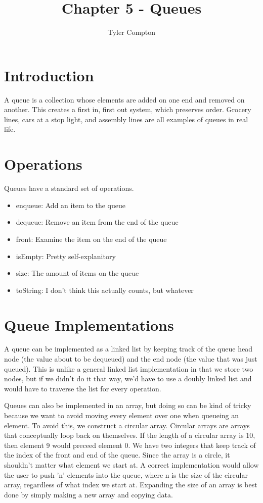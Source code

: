 \documentclass{article}
\author{Tyler Compton}
\title{Chapter 5 - Queues}
\begin{document}
\maketitle
\tableofcontents

\section{Introduction}
A queue is a collection whose elements are added on one end and removed on
another. This creates a first in, first out system, which preserves order.
Grocery lines, cars at a stop light, and assembly lines are all examples of
queues in real life.

\section{Operations}
Queues have a standard set of operations.

\begin{itemize}
	\item enqueue: Add an item to the queue
	\item dequeue: Remove an item from the end of the queue
	\item front: Examine the item on the end of the queue
	\item isEmpty: Pretty self-explanitory
	\item size: The amount of items on the queue
	\item toString: I don't think this actually counts, but whatever
\end{itemize}

\section{Queue Implementations}
A queue can be implemented as a linked list by keeping track of the queue head
node (the value about to be dequeued) and the end node (the value that was just
queued). This is unlike a general linked list implementation in that we store
two nodes, but if we didn't do it that way, we'd have to use a doubly linked
list and would have to traverse the list for every operation.

Queues can also be implemented in an array, but doing so can be kind of tricky
because we want to avoid moving every element over one when queueing an
element. To avoid this, we construct a circular array. Circular arrays are
arrays that conceptually loop back on themselves. If the length of a circular
array is 10, then element 9 would preceed element 0. We have two integers that
keep track of the index of the front and end of the queue. Since the array is a
circle, it shouldn't matter what element we start at. A correct implementation
would allow the user to push 'n' elements into the queue, where n is the size
of the circular array, regardless of what index we start at. Expanding the size
of an array is best done by simply making a new array and copying data.
\end{document}
